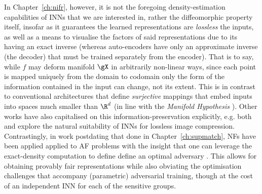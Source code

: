 %
In Chapter~\ref{ch:nifr}, however, it is not the foregoing density-estimation capabilities of INNs
that we are interested in, rather the diffeomorphic property itself, insofar as it guarantees the
learned representations are \emph{lossless} \wrt{} the inputs, as well as a means to visualise the
factors of said representations due to its having an exact inverse (whereas auto-encoders have only
an approximate inverse (the decoder) that must be trained separately from the encoder).
%
That is to say, while \(f\) may deform manifold \(\gX\) in arbitrarily non-linear ways, since each
point is mapped uniquely from the domain to codomain only the form of the information contained in
the input can change, not its extent. 
%
This is in contrast to conventional architectures that define \emph{surjective} mappings that embed
inputs into spaces much smaller than \(\R^d\) (in line with the \emph{Manifold Hypothesis}
\citep{fefferman2016testing}).
%
Other works have also capitalised on this information-preservation explicitly, e.g. both
\citet{hoogeboom2019integer} and \citet{xie2021enhanced} explore the natural suitability of INNs for
lossless image compression.
%
Contrastingly, in work postdating that done in Chapter~\ref{ch:supmatch}, \acp{NF} have been
applied applied to \ac{AF} problems with the insight that one can leverage the exact-density
computation to define define an optimal adversary \citep{balunovic2021fair, cerrato2022fair}. 
%
This allows for obtaining provably fair representations while also obviating the optimisation
challenges that accompany (parametric) adversarial training, though at the cost of an independent
\ac{INN} for each of the sensitive groups.

